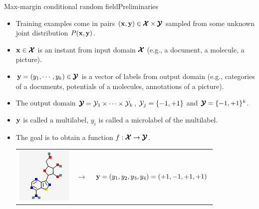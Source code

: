\documentclass[first=dgreen,second=purple,logo=yellowexc]{aaltoslides}
\begin{document}
{\begin{frame}{Max-margin conditional random field}{Preliminaries}
	\begin{itemize}
		\item Training examples come in pairs $(\mathbf {x},\mathbf {y})\in\pmb {\mathcal{X}}\times\pmb {\mathcal{Y}}$ sampled from some unknown joint distribution $P(\mathbf {x},\mathbf {y})$.
		\item $\mathbf {x}\in\pmb {\mathcal{X}}$ is an instant from input domain $\pmb {\mathcal{X}}$ (e.g., a document, a molecule, a picture).
		\item $\mathbf {y}=(y_1,\cdots,y_k)\in\pmb {\mathcal{Y}}$ is a vector of labels from output domain (e.g., categories of a documents, potentials of a molecules, annotations of a picture).
		\item The output domain $\pmb {\mathcal{Y}}=\mathcal{Y}_1\times\cdots\times\mathcal{Y}_k$, $\mathcal{Y}_j=\{-1,+1\}$ and $\pmb {\mathcal{Y}}=\{-1,+1\}^k$.
		\item $\mathbf {y}$ is called a multilabel, $y_i$ is called a microlabel of the multilabel.
		\item The goal is to obtain a function $f:\pmb {\mathcal{X}}\rightarrow\pmb {\mathcal{Y}}$.
		\begin{table}
		\footnotesize
		\begin{tabular}{p{1cm}p{1cm}p{10cm}}
        \multirow{3}{*}{\includegraphics[scale = 0.3]{./figures/mol1.png}} & 
			& \\ 
		& $\rightarrow$	& $\mathbf {y}=(y_1,y_2,y_3,y_4)=(+1,-1,+1,+1)$ \\
		&	& \\ 
        \end{tabular}
        \end{table}
	\end{itemize}
\end{frame}

}
\end{document}
